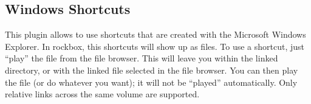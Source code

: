\subsection{Windows Shortcuts}
\label{ref:Winshortcutsplugin}

This plugin allows to use shortcuts that are created with the Microsoft
Windows Explorer. In rockbox, this shortcuts will show up as 
files. To use a shortcut, just ``play'' the  file from the file
browser. This will leave you within the linked directory, or with the linked
file selected in the file browser. You can then play the file (or do whatever
you want); it will not be ``played'' automatically.
Only relative links across the same volume are supported.


